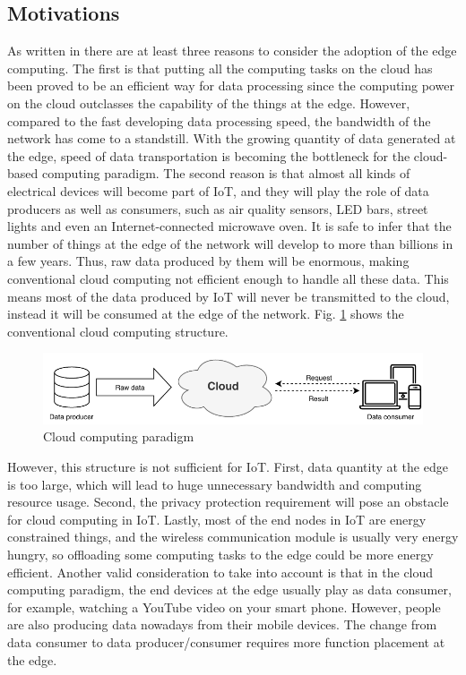 \subsection{Motivations}
As written in \cite{edgecomputingvision} there are at least three reasons to consider the adoption of the edge computing. The first is that putting all the computing tasks on the cloud has been proved to be an efficient way for data processing since the computing power on the cloud outclasses the capability of the things at the edge. However, compared to the fast developing data processing speed, the bandwidth of the network has come to a standstill. With the growing quantity of data generated at the edge, speed of data transportation is becoming the bottleneck for the cloud-based computing paradigm.
The second reason is that almost all kinds of electrical devices will become part of IoT, and they will play the role of data producers as well as consumers, such as air quality sensors, LED bars, street lights and even an Internet-connected microwave oven. It is safe to infer that the number of things at the edge of the network will develop to more than billions in a few
years. Thus, raw data produced by them will be enormous, making conventional cloud computing not efficient enough to handle all these data. This means most of the data produced by IoT will never be transmitted to the cloud, instead it will be consumed at the edge of the network. Fig. \ref{fig:cloudarch} shows the conventional cloud computing structure.

\begin{figure}
	\includegraphics[width=0.9\linewidth]{images/cloudarch}
	\caption{Cloud computing paradigm}
	\label{fig:cloudarch}
\end{figure}

However, this structure is not sufficient for IoT. First, data quantity at the edge is too large, which will lead to huge unnecessary bandwidth and computing resource usage. Second, the privacy protection requirement will pose an obstacle for cloud computing in IoT. Lastly, most of the end nodes in IoT are energy constrained things, and the wireless communication module is usually very energy hungry, so offloading some computing tasks to the edge could be more energy efficient.
Another valid consideration to take into account is that in the cloud computing paradigm, the end devices at the edge usually play as data consumer, for example, watching a YouTube video on
your smart phone. However, people are also producing data nowadays from their mobile devices. The change from data consumer to data producer/consumer requires more function placement at the edge.



